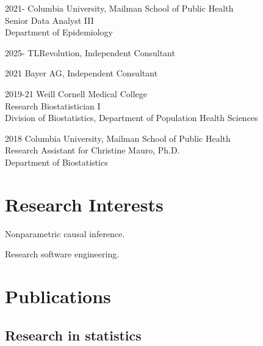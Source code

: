 \documentclass[12pt,letterpaper]{report}
\newcommand{\listitemspace}{0.15em}
\renewenvironment{itemize}
{\begin{list}{}{\setlength{\leftmargin}{0em}
            \setlength{\parskip}{0em}
            \setlength{\itemsep}{\listitemspace}
            \setlength{\parsep}{\listitemspace}}}
    {\end{list}}
\begin{document}
    \begin{tablist}
    
    	\item[2021-] \tab Columbia University, Mailman School of Public Health \\
						  Senior Data Analyst III \\
						  Department of Epidemiology
						  
	\item[2025-] \tab TLRevolution, Independent Consultant
						  
	\item[2021] \tab Bayer AG, Independent Consultant

        \item[2019-21] \tab Weill Cornell Medical College \\
                            Research Biostatistician I  \\
                            Division of Biostatistics, Department of Population Health Sciences 
        
        \item[2018]  \tab Columbia University, Mailman School of Public Health \\
                          Research Assistant for Christine Mauro, Ph.D. \\
                          Department of Biostatistics

    \end{tablist}

    \section*{Research Interests}

    \begin{itemize}

        \item Nonparametric causal inference.

        \item Research software engineering.

    \end{itemize}

    \section*{Publications}
    
    \subsection*{Research in statistics}
    
\end{document}
